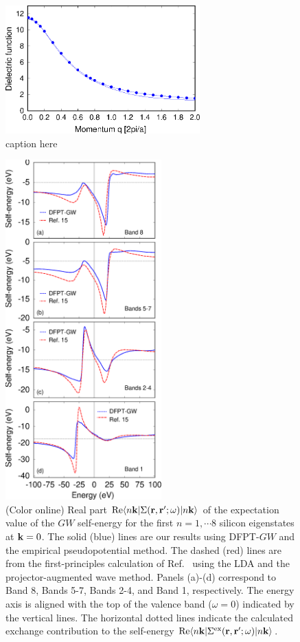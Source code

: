 \documentclass[twocolumn,prb,showpacs,superscriptaddress]{revtex4}
\def\w{\omega}
\def\k{{\bf k}}
\def\r{{\bf r}}
\def\rp{{\bf r^\prime}}
\begin{document}
\begin  {figure}
\begin  {center}
\includegraphics[width=7.5cm]{fig1.eps}
\end    {center}
\caption{\label{fig1}
        caption here
        }
\end    {figure}

\begin  {figure}
\begin  {center}
\includegraphics[width=6cm]{fig.sigma.eps}
\end    {center}
\caption{\label{fig.sigma}
        (Color online)
        Real part ${\rm Re} \langle n\k| \Sigma(\r,\rp;\w)|n\k\rangle$   of the expectation value of the $GW$ self-energy for the first 
        $n=1,\cdots 8$ silicon eigenstates at $\k=0$. The solid (blue) lines are our results using DFPT-$GW$ and the empirical
        pseudopotential method. The dashed (red) lines are from the first-principles calculation of Ref.\  
        using the LDA and the projector-augmented wave method. Panels (a)-(d) correspond to Band 8, Bands 5-7, Bands 2-4, and Band 1,
        respectively. The energy axis is aligned with the top of the valence band ($\w=0$) indicated by the vertical lines.
        The horizontal dotted lines indicate the calculated exchange contribution to the self-energy ${\rm Re} \langle n\k| \Sigma^{\rm ex}(\r,\rp;\w)|n\k\rangle$.
        }
\end    {figure}
\end{document}
